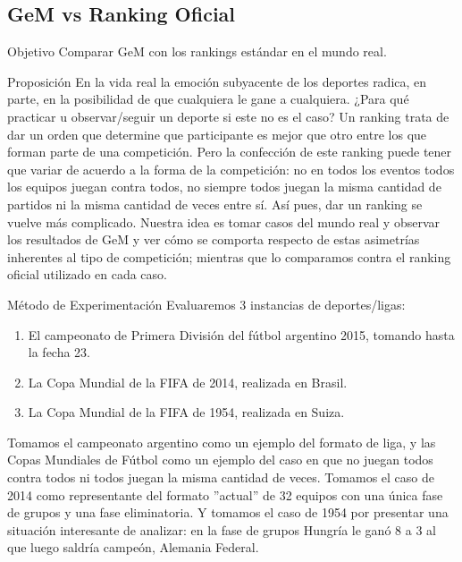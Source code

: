 \subsection{GeM vs Ranking Oficial}
\label{subsec:exp6}
\begin{LaTeXdescription}
    \item[Objetivo] Comparar GeM con los rankings estándar en el mundo real.\\

    \item[Proposici\'on] En la vida real la emoción subyacente de los deportes
        radica, en parte, en la posibilidad de que cualquiera le gane a
        cualquiera. ¿Para qué practicar u observar/seguir un deporte si este no
        es el caso?  Un ranking trata de dar un orden que determine que
        participante es mejor que otro entre los que forman parte de una
        competición. Pero la confección de este ranking puede tener que variar
        de acuerdo a la forma de la competición: no en todos los eventos todos
        los equipos juegan contra todos, no siempre todos juegan la misma
        cantidad de partidos ni la misma cantidad de veces entre sí. Así pues,
        dar un ranking se vuelve más complicado. Nuestra idea es tomar casos del
        mundo real y observar los resultados de GeM y ver cómo se comporta
        respecto de estas asimetrías inherentes al tipo de competición; mientras
        que lo comparamos contra el ranking oficial utilizado en cada caso.\\

    \item[M\'etodo de Experimentaci\'on] Evaluaremos 3 instancias de
        deportes/ligas:

        \begin{enumerate}
            \item El campeonato de Primera División del fútbol argentino 2015,
                tomando hasta la fecha 23.

            \item La Copa Mundial de la FIFA de 2014, realizada en Brasil.

            \item La Copa Mundial de la FIFA de 1954, realizada en Suiza.
        \end{enumerate}
        \medskip

        \par Tomamos el campeonato argentino como un ejemplo del formato de
        liga, y las Copas Mundiales de Fútbol como un ejemplo del caso en que no
        juegan todos contra todos ni todos juegan la misma cantidad de veces.
        Tomamos el caso de 2014 como representante del formato ''actual'' de 32
        equipos con una única fase de grupos y una fase eliminatoria. Y tomamos
        el caso de 1954 por presentar una situación interesante de analizar: en
        la fase de grupos Hungría le ganó 8 a 3 al que luego saldría campeón,
        Alemania Federal.


\end{LaTeXdescription}
